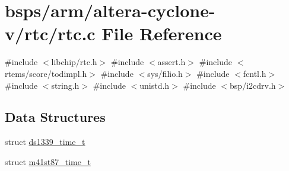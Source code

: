 \hypertarget{arm_2altera-cyclone-v_2rtc_2rtc_8c}{}\section{bsps/arm/altera-\/cyclone-\/v/rtc/rtc.c File Reference}
\label{arm_2altera-cyclone-v_2rtc_2rtc_8c}
{\ttfamily \#include $<$libchip/rtc.\+h$>$}\newline
{\ttfamily \#include $<$assert.\+h$>$}\newline
{\ttfamily \#include $<$rtems/score/todimpl.\+h$>$}\newline
{\ttfamily \#include $<$sys/filio.\+h$>$}\newline
{\ttfamily \#include $<$fcntl.\+h$>$}\newline
{\ttfamily \#include $<$string.\+h$>$}\newline
{\ttfamily \#include $<$unistd.\+h$>$}\newline
{\ttfamily \#include $<$bsp/i2cdrv.\+h$>$}\newline
\subsection*{Data Structures}
\begin{DoxyCompactItemize}
\item 
struct \mbox{\hyperlink{structds1339__time__t}{ds1339\+\_\+time\+\_\+t}}
\item 
struct \mbox{\hyperlink{structm41st87__time__t}{m41st87\+\_\+time\+\_\+t}}
\end{DoxyCompactItemize}
